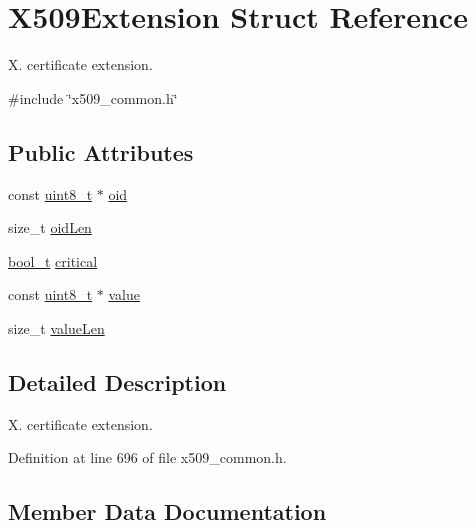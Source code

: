 \hypertarget{structX509Extension}{}\section{X509\+Extension Struct Reference}
\label{structX509Extension}


X. certificate extension.  




{\ttfamily \#include \char`\"{}x509\+\_\+common.\+h\char`\"{}}

\subsection*{Public Attributes}
\begin{DoxyCompactItemize}
\item 
const \hyperlink{stdint_8h_aba7bc1797add20fe3efdf37ced1182c5}{uint8\+\_\+t} $\ast$ \hyperlink{structX509Extension_a3bb16b166862712604b01d136b6cdab2}{oid}
\item 
size\+\_\+t \hyperlink{structX509Extension_a6d4c36c0f0ba38c228a1dc3cf20e4981}{oid\+Len}
\item 
\hyperlink{compiler__port_8h_a812d16e5494522586b3784e55d479912}{bool\+\_\+t} \hyperlink{structX509Extension_afa8e6dfc4bdcca74d71d699e3a75bf88}{critical}
\item 
const \hyperlink{stdint_8h_aba7bc1797add20fe3efdf37ced1182c5}{uint8\+\_\+t} $\ast$ \hyperlink{structX509Extension_a0ae0ef35ada444d669c37c0ba83856be}{value}
\item 
size\+\_\+t \hyperlink{structX509Extension_a0755db4dfc17cf65b84bb318852db166}{value\+Len}
\end{DoxyCompactItemize}


\subsection{Detailed Description}
X. certificate extension. 

Definition at line 696 of file x509\+\_\+common.\+h.



\subsection{Member Data Documentation}
\mbox{\label{structX509Extension_afa8e6dfc4bdcca74d71d699e3a75bf88}} 
